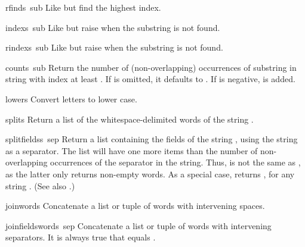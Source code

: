 \begin{funcdesc}{rfind}{s\, sub}
Like  but find the highest index.
\end{funcdesc}

\begin{funcdesc}{index}{s\, sub}
Like  but raise  when the substring is
not found.
\end{funcdesc}

\begin{funcdesc}{rindex}{s\, sub}
Like  but raise  when the substring is
not found.
\end{funcdesc}

\begin{funcdesc}{count}{s\, sub}
Return the number of (non-overlapping) occurrences of substring
 in string  with index at least .
If  is omitted, it defaults to .  If  is
negative,  is added.
\end{funcdesc}

\begin{funcdesc}{lower}{s}
Convert letters to lower case.
\end{funcdesc}

\begin{funcdesc}{split}{s}
Return a list of the whitespace-delimited words of the string
.
\end{funcdesc}

\begin{funcdesc}{splitfields}{s\, sep}
  Return a list containing the fields of the string , using
  the string  as a separator.  The list will have one more
  items than the number of non-overlapping occurrences of the
  separator in the string.  Thus,  is not the same as , as the latter
  only returns non-empty words.  As a special case,
   returns \code{[\var{s}]}, for any string
  .  (See also .)
\end{funcdesc}

\begin{funcdesc}{join}{words}
Concatenate a list or tuple of words with intervening spaces.
\end{funcdesc}

\begin{funcdesc}{joinfields}{words\, sep}
Concatenate a list or tuple of words with intervening separators.
It is always true that
equals .
\end{funcdesc}

